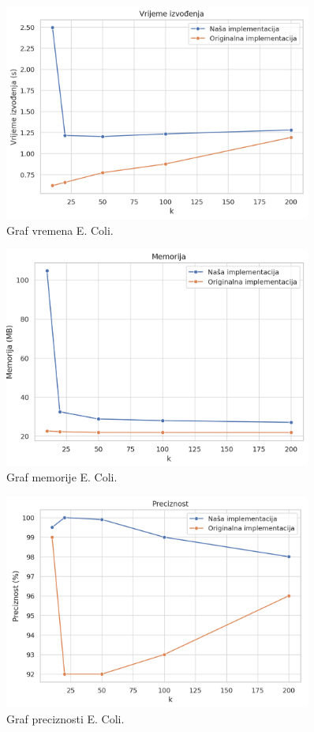 \documentclass[seminarskirad]{fer}
\begin{document}
\begin{figure}[h]
	\centering
	\includegraphics[width=0.9\textwidth]{images/EColi_rezultati_vrijeme.png}
	\caption{Graf vremena E. Coli.}
	\label{fig:EColi_rezultati_vrijeme}
\end{figure}
\begin{figure}[h]
	\centering
	\includegraphics[width=0.9\textwidth]{images/EColi_rezultati_memorija.png}
	\caption{Graf memorije E. Coli.}
	\label{fig:EColi_rezultati_memorija}
\end{figure}
\begin{figure}[h]
	\centering
	\includegraphics[width=0.9\textwidth]{images/EColi_rezultati_preciznost.png}
	\caption{Graf preciznosti E. Coli.}
	\label{fig:EColi_rezultati_preciznost}
\end{figure}
\end{document}
